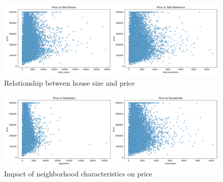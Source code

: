 \documentclass[a4paper, 11pt]{article}
\begin{document}
\begin{figure}[h]
    \centering
    \includegraphics[width=\linewidth]{figs/price_vs_size.png}
    \caption{Relationship between house size and price}
    \label{fig:price_size}
\end{figure}

\begin{figure}[h]
    \centering
    \includegraphics[width=\linewidth]{figs/price_vs_neighborhood.png}
    \caption{Impact of neighborhood characteristics on price}
    \label{fig:price_neighborhood}
\end{figure}
\end{document}
